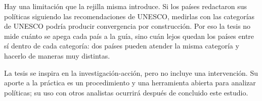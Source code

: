 Hay una limitación que la rejilla misma introduce. Si los países redactaron sus políticas
siguiendo las recomendaciones de UNESCO, medirlas con las categorías de UNESCO podría
producir convergencia por construcción. Por eso la tesis no mide cuánto se apega cada país a
la guía, sino cuán lejos quedan los países entre sí dentro de cada categoría: dos países
pueden atender la misma categoría y hacerlo de maneras muy distintas.

La tesis se inspira en la investigación-acción, pero no incluye una intervención. Su aporte
a la práctica es un procedimiento y una herramienta abierta para analizar políticas; su uso
con otros analistas ocurrirá después de concluido este estudio.
